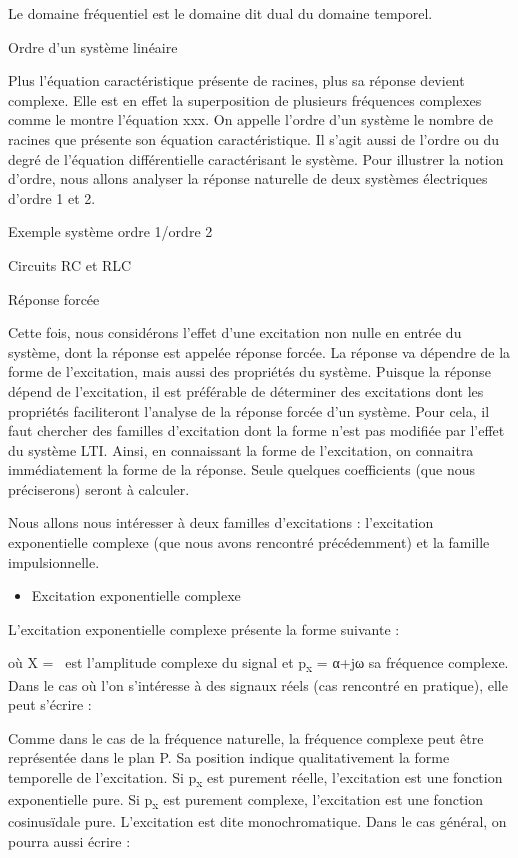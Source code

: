 \documentclass[]{article}
\begin{document}
Le domaine fréquentiel est le domaine dit dual du domaine temporel.

Ordre d'un système linéaire

Plus l'équation caractéristique présente de racines, plus sa réponse
devient complexe. Elle est en effet la superposition de plusieurs
fréquences complexes comme le montre l'équation xxx. On appelle l'ordre
d'un système le nombre de racines que présente son équation
caractéristique. Il s'agit aussi de l'ordre ou du degré de l'équation
différentielle caractérisant le système. Pour illustrer la notion
d'ordre, nous allons analyser la réponse naturelle de deux systèmes
électriques d'ordre 1 et 2.

Exemple système ordre 1/ordre 2

Circuits RC et RLC

Réponse forcée

Cette fois, nous considérons l'effet d'une excitation non nulle en
entrée du système, dont la réponse est appelée réponse forcée. La
réponse va dépendre de la forme de l'excitation, mais aussi des
propriétés du système. Puisque la réponse dépend de l'excitation, il est
préférable de déterminer des excitations dont les propriétés
faciliteront l'analyse de la réponse forcée d'un système. Pour cela, il
faut chercher des familles d'excitation dont la forme n'est pas modifiée
par l'effet du système LTI. Ainsi, en connaissant la forme de
l'excitation, on connaitra immédiatement la forme de la réponse. Seule
quelques coefficients (que nous préciserons) seront à calculer.

Nous allons nous intéresser à deux familles d'excitations : l'excitation
exponentielle complexe (que nous avons rencontré précédemment) et la
famille impulsionnelle.

\begin{itemize}
\itemsep1pt\parskip0pt
\item
  Excitation exponentielle complexe
\end{itemize}

L'excitation exponentielle complexe présente la forme suivante :

où X =~ est l'amplitude complexe du signal et p\textsubscript{x} = α+jω
sa fréquence complexe. Dans le cas où l'on s'intéresse à des signaux
réels (cas rencontré en pratique), elle peut s'écrire :

Comme dans le cas de la fréquence naturelle, la fréquence complexe peut
être représentée dans le plan P. Sa position indique qualitativement la
forme temporelle de l'excitation. Si p\textsubscript{x} est purement
réelle, l'excitation est une fonction exponentielle pure. Si
p\textsubscript{x} est purement complexe, l'excitation est une fonction
cosinusïdale pure. L'excitation est dite monochromatique. Dans le cas
général, on pourra aussi écrire :
\end{document}
